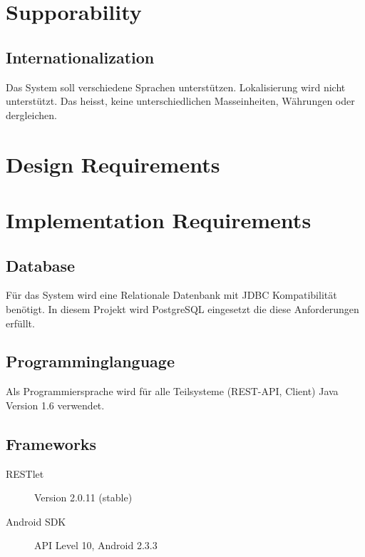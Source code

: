\documentclass[10pt,a4paper]{scrartcl}
\begin{document}
\section{Supporability}
\subsection{Internationalization}
Das System soll verschiedene Sprachen unterstützen. Lokalisierung wird nicht unterstützt. Das heisst, keine unterschiedlichen Masseinheiten, Währungen oder dergleichen.
\section{Design Requirements}
\section{Implementation Requirements}
\subsection{Database}
Für das System wird eine Relationale Datenbank mit JDBC Kompatibilität benötigt.
In diesem Projekt wird PostgreSQL eingesetzt die diese Anforderungen erfüllt.
\subsection{Programminglanguage}
Als Programmiersprache wird für alle Teilsysteme (REST-API, Client) Java Version 1.6 verwendet.
\subsection{Frameworks}
\begin{description}
\item[RESTlet] Version 2.0.11 (stable)
\item[Android SDK] API Level 10, Android 2.3.3 
\end{description}
\end{document}
